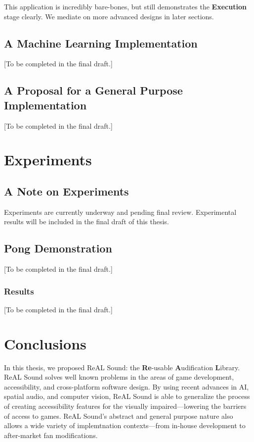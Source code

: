 \documentclass{report}
\newcommand{\rs}{ReAL Sound\xspace}
\newcommand{\rsfull}{\textbf{Re}-usable \textbf{A}udification \textbf{L}ibrary\xspace}
\newcommand{\exec}{\textbf{Execution}\xspace}
\begin{document}
This application is incredibly bare-bones, but still demonstrates the \exec stage clearly. We mediate on more advanced designs in later sections.

\section{A Machine Learning Implementation}
[To be completed in the final draft.]

\section{A Proposal for a General Purpose Implementation}
[To be completed in the final draft.]

\chapter{Experiments} 

\section{A Note on Experiments}
Experiments are currently underway and pending final review. Experimental results will be included in the final draft of this thesis. 

\section{Pong Demonstration}
[To be completed in the final draft.]

\subsection{Results}
[To be completed in the final draft.]

\chapter{Conclusions}
In this thesis, we proposed \rs: the \rsfull. \rs solves well known problems in the areas of game development, accessibility, and cross-platform software design. By using recent advances in AI, spatial audio, and computer vision, \rs is able to generalize the process of creating accessibility features for the visually impaired---lowering the barriers of access to games. \rs's abstract and general purpose nature also allows a wide variety of implemtnation contexts---from in-house development to after-market fan modifications.
\end{document}
